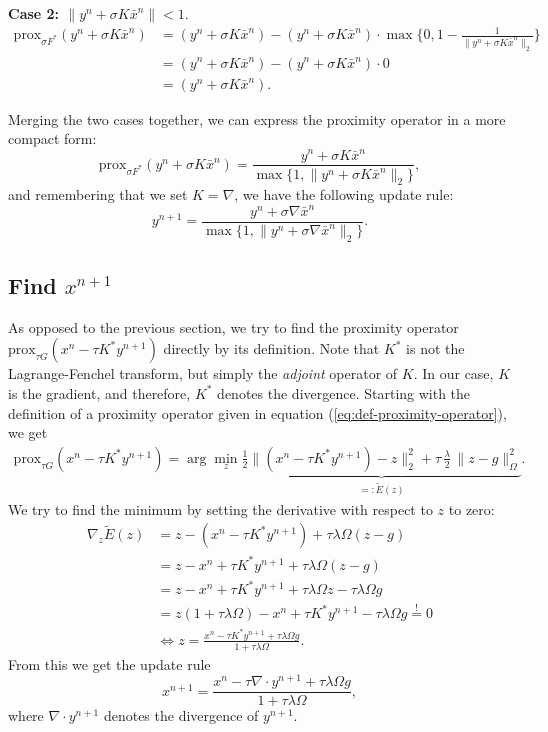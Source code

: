 \documentclass{paper}
\newcommand{\prox}{\text{prox}}
\begin{document}
\textbf{Case 2: $\|y^n + \sigma K \bar x^n\| < 1.$}
\begin{align*}
\prox_{\sigma F^*}(y^n + \sigma K \bar x^n) &=  (y^n + \sigma K \bar x^n) - (y^n + \sigma K \bar x^n) \cdot \max\{0, 1 - \frac{1}{\|y^n + \sigma K \bar x^n\|_2}\} \\
&= (y^n + \sigma K \bar x^n) - (y^n + \sigma K \bar x^n) \cdot 0 \\
&= (y^n + \sigma K \bar x^n).
\end{align*}

Merging the two cases together, we can express the proximity operator in a more compact form:
$$\prox_{\sigma F^*}(y^n + \sigma K \bar x^n) = \frac{y^n + \sigma K \bar x^n}{\max\{1,\|y^n + \sigma K \bar x^n\|_2\}},$$
and remembering that we set $K = \nabla$, we have the following update rule:
$$y^{n+1} = \frac{y^n + \sigma \nabla \bar x^n}{\max\{1,\|y^n + \sigma \nabla \bar x^n\|_2\}}.$$

\subsection{Find $x^{n+1}$}
As opposed to the previous section, we try to find the proximity operator $\prox_{\tau G}(x^n - \tau K^* y^{n+1})$ directly by its definition. Note that $K^*$ is not the Lagrange-Fenchel transform, but simply the \emph{adjoint} operator of $K$. In our case, $K$ is the gradient, and therefore, $K^*$ denotes the divergence. Starting with the definition of a proximity operator given in equation (\ref{eq:def-proximity-operator}), we get 
\begin{align*}
 \prox_{\tau G}(x^n - \tau K^* y^{n+1}) = \arg\min_z \underbrace{\frac{1}{2} \|(x^n - \tau K^* y^{n+1})-z\|_2^2 + \tau \, \frac{\lambda}{2} \, \|z-g\|_\Omega^2}_{=: \tilde E(z)}.
\end{align*}
We try to find the minimum by setting the derivative with respect to $z$ to zero:
\begin{align*}
 \nabla_z \tilde E(z) &= z - (x^n - \tau K^* y^ {n+1}) + \tau \lambda \Omega (z-g) \\
 &= z - x^n + \tau K^* y^{n+1} + \tau \lambda \Omega (z-g) \\
 &= z - x^n + \tau K^* y^{n+1} + \tau \lambda \Omega z -\tau \lambda \Omega g \\
 &= z(1 + \tau \lambda \Omega) - x^n + \tau K^* y^{n+1} - \tau \lambda \Omega g \stackrel{!}{=} 0 \\
 &\Longleftrightarrow z = \frac{x^n - \tau K^* y^{n+1} + \tau \lambda \Omega g}{1 + \tau \lambda \Omega}.
\end{align*}
From this we get the update rule
$$x^{n+1} = \frac{x^n - \tau \nabla \cdot y^{n+1} + \tau \lambda \Omega g}{1 + \tau \lambda \Omega},$$
where $\nabla \cdot y^{n+1}$ denotes the divergence of $y^{n+1}$.
\end{document}
